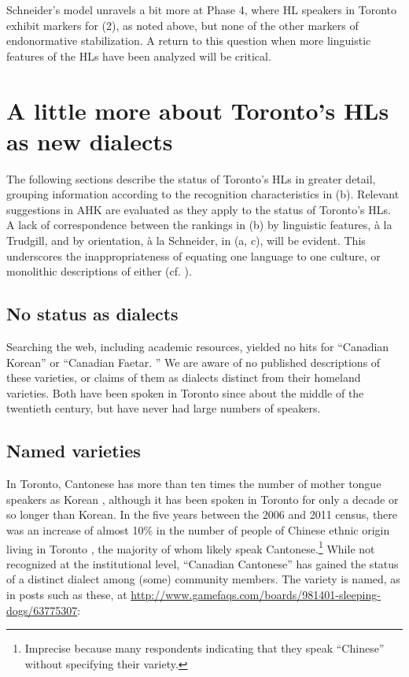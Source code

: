 \documentclass[output=paper]{LSP/langsci}
\begin{document}
Schneider’s model unravels a bit more at Phase 4, where HL speakers in Toronto exhibit markers for \textsc{(2)}, as noted above, but none of the other markers of endonormative stabilization. A return to this question when more linguistic features of the HLs have been analyzed will be critical.

\section{A little more about Toronto’s HLs as new dialects}

The following sections describe the status of Toronto’s HLs in greater detail, grouping information according to the recognition characteristics in  (b). Relevant suggestions in AHK are evaluated as they apply to the status of Toronto’s HLs. A lack of correspondence between the rankings in  (b) by linguistic features, à la Trudgill, and by orientation, à la Schneider, in  (a, c), will be evident. This underscores the inappropriateness of equating one language to one culture, or monolithic descriptions of either (cf. \citealt{foley_personhood_2005}). 

\subsection{No status as dialects}

Searching the web, including academic resources, yielded no hits for “Canadian Korean” or “Canadian Faetar. ” We are aware of no published descriptions of these varieties, or claims of them as dialects distinct from their homeland varieties. Both have been spoken in Toronto since about the middle of the twentieth century, but have never had large numbers of speakers.

\subsection{Named varieties}

In Toronto, Cantonese has more than ten times the number of mother tongue speakers as Korean \citep{statistics_canada_census_2011}, although it has been spoken in Toronto for only a decade or so longer than Korean. In the five years between the 2006 and 2011 census, there was an increase of almost 10\% in the number of people of Chinese ethnic origin living in Toronto \citep{statistics_canada_2011_2011}, the majority of whom likely speak Cantonese.\footnote{ Imprecise because many respondents indicating that they speak “Chinese” without specifying their variety. } While not recognized at the institutional level, “Canadian Cantonese” has gained the status of a distinct dialect among (some) community members. The variety is named, as in posts such as these, at \url{http://www.gamefaqs.com/boards/981401-sleeping-dogs/63775307}:
\end{document}
